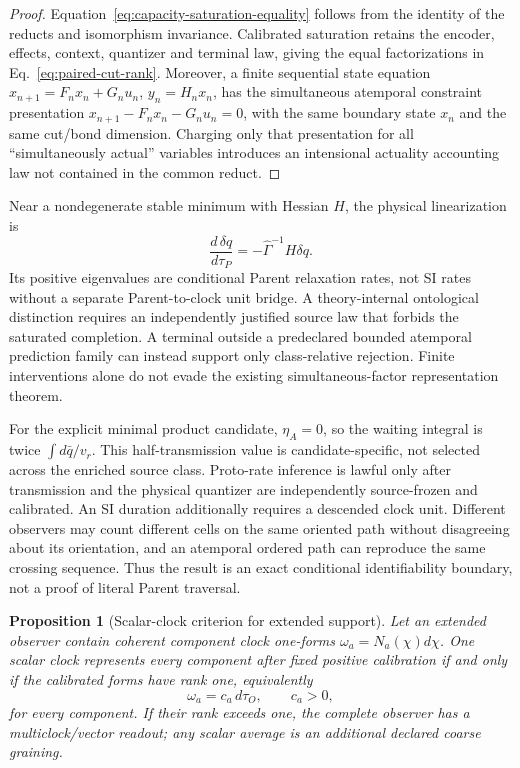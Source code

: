 \documentclass[11pt]{article}
\newtheorem{proposition}{Proposition}
\begin{document}
\begin{proof}
Equation~\eqref{eq:capacity-saturation-equality} follows from the identity of
the reducts and isomorphism invariance.  Calibrated saturation retains the
encoder, effects, context, quantizer and terminal law, giving the equal
factorizations in Eq.~\eqref{eq:paired-cut-rank}.  Moreover, a finite
sequential state equation
\(x_{n+1}=F_nx_n+G_nu_n\), \(y_n=H_nx_n\), has the simultaneous
atemporal constraint presentation
\(x_{n+1}-F_nx_n-G_nu_n=0\), with the same boundary state \(x_n\) and
the same cut/bond dimension.  Charging only that presentation for all
``simultaneously actual'' variables introduces an intensional actuality
accounting law not contained in the common reduct.
\end{proof}

Near a nondegenerate stable minimum with Hessian \(H\), the physical
linearization is
\begin{equation}
 \frac{d\,\delta q}{d\tau_P}=-\widehat\Gamma^{-1}H\delta q.
 \label{eq:calibrated-eocc-linearization}
\end{equation}
Its positive eigenvalues are conditional Parent relaxation rates, not SI
rates without a separate Parent-to-clock unit bridge.  A theory-internal
ontological distinction requires an independently justified source law that
forbids the saturated completion.  A terminal outside a predeclared bounded
atemporal prediction family can instead support only class-relative
rejection.  Finite interventions alone do not evade
the existing simultaneous-factor representation theorem.

For the explicit minimal product candidate, \(\eta_A=0\), so the waiting integral is
twice \(\int d\bar q/v_r\).  This half-transmission value is candidate-specific,
not selected across the enriched source class.  Proto-rate inference is lawful
only after transmission and the physical quantizer are independently
source-frozen and calibrated.  An SI duration additionally requires a
descended clock unit.  Different observers may count different cells on the
same oriented path without disagreeing about its orientation, and an
atemporal ordered path can reproduce the same crossing sequence.  Thus the
result is an exact conditional identifiability boundary, not a proof of
literal Parent traversal.

\begin{proposition}[Scalar-clock criterion for extended support]
Let an extended observer contain coherent component clock one-forms
$\omega_a=N_a(\chi)d\chi$. One scalar clock represents every component after
fixed positive calibration if and only if the calibrated forms have rank one,
equivalently
\begin{equation}
 \omega_a=c_a\,d\tau_O,
 \qquad c_a>0,
 \label{eq:scalar-clock-criterion}
\end{equation}
for every component. If their rank exceeds one, the complete observer has a
multiclock/vector readout; any scalar average is an additional declared
coarse graining.
\end{proposition}
\end{document}
